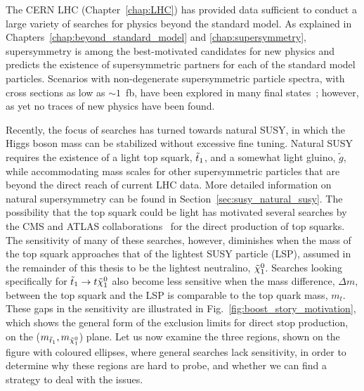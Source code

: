

The CERN LHC (Chapter~\ref{chap:LHC}) has provided data sufficient to conduct a large variety of
searches for physics beyond the standard model.
As explained in Chapters~\ref{chap:beyond_standard_model} and \ref{chap:supersymmetry},
supersymmetry is among the best-motivated candidates for new physics and predicts the existence of
supersymmetric partners for each of the standard model particles.  
Scenarios with non-degenerate supersymmetric particle spectra, with cross sections as low as
${\sim}1$~fb, have been explored in many final states~\cite{CMS-PAS-SUS-13-020}; however, as yet no
traces of new physics have been found.  

Recently, the focus of searches has turned towards natural SUSY, in which the Higgs boson mass can
be stabilized without excessive fine tuning. Natural SUSY requires the existence of a light top
squark, $\tilde{t}_1$, and a somewhat light gluino, $\tilde{g}$, while accommodating mass scales for
other supersymmetric particles that are beyond the direct reach of current LHC data.  
More detailed information on natural supersymmetry can be found in
Section~\ref{sec:susy_natural_susy}. 
The possibility that the top squark could be light has motivated several searches by the CMS and
ATLAS
collaborations~\cite{Aad:2013ija,Aad:2014qaa,Aad:2014bva,Aad:2014kva,Aad:2014kra,Chatrchyan:2013xna,
Chatrchyan:2013mya,Khachatryan:2014doa} for the direct production of top squarks. The sensitivity of
many of these searches, however, diminishes when the mass of the top squark approaches that of the
lightest SUSY particle (LSP), assumed in the remainder of this thesis to be the lightest neutralino,
$\tilde{\chi}_1^0$. Searches looking specifically for $\tilde{t}_1 \rightarrow t \tilde{\chi}_1^0$ also become less sensitive
when the mass difference, $\Delta m$, between the top squark and the LSP is comparable to the top
quark mass, $m_t$. 
These gaps in the sensitivity are illustrated in Fig.~\ref{fig:boost_story_motivation}, which shows
the general form of the exclusion limits for direct stop production, on the
($m_{\tilde{t}_1},m_{\tilde{\chi}_1^0}$) plane. 
Let us now examine the three regions, shown on the figure with coloured ellipses, where general
searches lack sensitivity, in order to determine why these regions are hard to probe, and whether we
can find a strategy to deal with the issues. 

